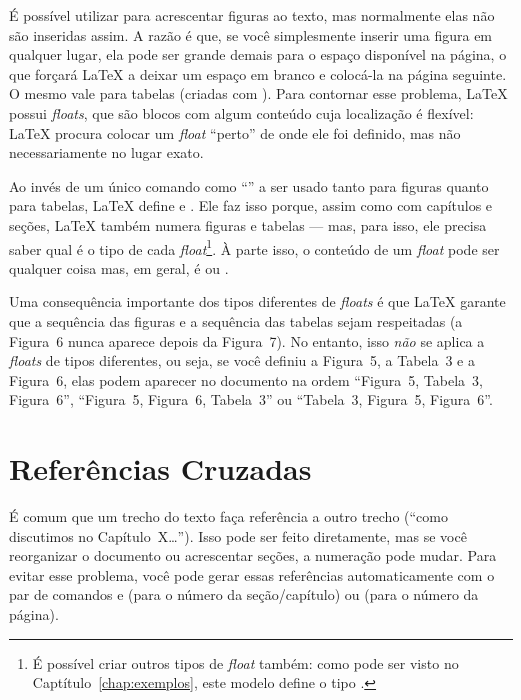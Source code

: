 É possível utilizar  para acrescentar figuras
ao texto, mas normalmente elas não são inseridas assim. A razão é que,
se você simplesmente inserir uma figura em qualquer lugar, ela pode
ser grande demais para o espaço disponível na página, o que forçará
\LaTeX{} a deixar um espaço em branco e colocá-la na página seguinte.
O mesmo vale para tabelas (criadas com ).
Para contornar esse problema, \LaTeX{} possui \emph{floats}, que
são blocos com algum conteúdo cuja localização é flexível: \LaTeX{}
procura colocar um \emph{float} ``perto'' de onde ele foi definido,
mas não necessariamente no lugar exato.

Ao invés de um único comando como ``'' a
ser usado tanto para figuras quanto para tabelas, \LaTeX{} define
 e . Ele faz isso
porque, assim como com capítulos e seções, \LaTeX{} também numera
figuras e tabelas --- mas, para isso, ele precisa saber qual é o tipo de
cada \emph{float}\footnote{É possível criar outros tipos de \emph{float}
também: como pode ser visto no Captítulo~\ref{chap:exemplos}, este
modelo define o tipo .}. À parte isso, o conteúdo de
um \emph{float} pode ser qualquer coisa mas, em geral, é
 ou .

Uma consequência importante dos tipos diferentes de \emph{floats} é que
\LaTeX{} garante que a sequência das figuras e a
sequência das tabelas sejam respeitadas (a Figura~6 nunca aparece depois da
Figura~7). No entanto, isso \emph{não} se aplica a \emph{floats} de tipos
diferentes, ou seja, se você definiu a Figura~5, a Tabela~3 e a Figura~6,
elas podem aparecer no documento na ordem ``Figura~5, Tabela~3, Figura~6'',
``Figura~5, Figura~6, Tabela~3'' ou ``Tabela~3, Figura~5, Figura~6''.

\section{Referências Cruzadas}
\label{sec:refs}

É comum que um trecho do texto faça referência a outro trecho (``como
discutimos no Capítulo~X\ldots''). Isso pode ser feito diretamente, mas
se você reorganizar o documento ou acrescentar seções, a numeração pode
mudar. Para evitar esse problema, você pode gerar essas referências
automaticamente com o par de comandos  e
 (para o número da seção/capítulo) ou
 (para o número da página).

